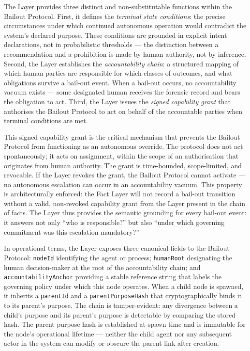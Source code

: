 The \purpose{} Layer provides three distinct and non-substitutable functions within the Bailout Protocol. First, it defines the \emph{terminal state conditions}: the precise circumstances under which continued autonomous operation would contradict the system's declared purpose. These conditions are grounded in explicit intent declarations, not in probabilistic thresholds — the distinction between a recommendation and a prohibition is made by human authority, not by inference. Second, the \purpose{} Layer establishes the \emph{accountability chain}: a structured mapping of which human parties are responsible for which classes of outcomes, and what obligations survive a bail-out event. When a bail-out occurs, no accountability vacuum exists — some designated human receives the forensic record and bears the obligation to act. Third, the \purpose{} Layer issues the \emph{signed capability grant} that authorises the Bailout Protocol to act on behalf of the accountable parties when terminal conditions are met.

This signed capability grant is the critical mechanism that prevents the Bailout Protocol from functioning as an autonomous override. The protocol does not act spontaneously; it acts on assignment, within the scope of an authorisation that originates from human authority. The grant is time-bounded, scope-limited, and revocable. If the \purpose{} Layer revokes the grant, the Bailout Protocol cannot activate — no autonomous escalation can occur in an accountability vacuum. This property is architecturally enforced: the Fact Layer will not record a bail-out transition without a valid, non-revoked capability grant from the \purpose{} Layer present in the chain of facts. The \purpose{} Layer thus provides the semantic grounding for every bail-out event: it answers not only ``who is responsible?'' but also ``under which governing commitment was this escalation mandatory?''

In operational terms, the \purpose{} Layer exposes three canonical fields to the Bailout Protocol: \texttt{nodeId} identifying the agent or process; \texttt{humanRoot} designating the human decision-maker at the root of the accountability chain; and \texttt{accountabilityAnchor} providing a stable reference string that labels the governing policy under which this node operates. When a child node is spawned, it inherits a \texttt{parentId} and a \texttt{parentPurposeHash} that cryptographically binds it to its parent's purpose. The chain is tamper-evident: any divergence between a child's purpose and its parent's purpose is detectable by comparing the stored hash. The parent purpose hash is established at spawn time and is immutable for the node's operational lifetime — neither the child agent nor any subsequent actor in the system can modify or obscure the parent link after creation.

